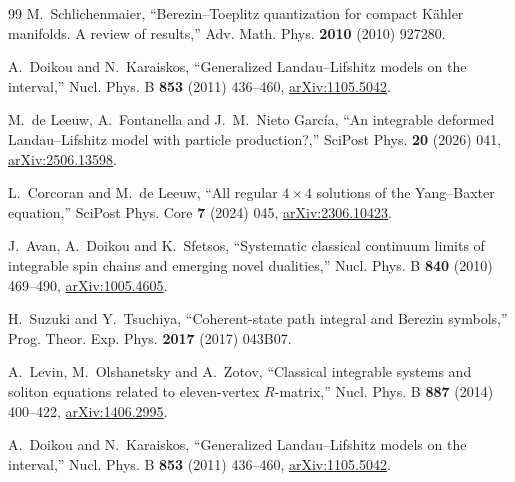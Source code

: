 \begin{thebibliography}{99}
M.~Schlichenmaier,
``Berezin--Toeplitz quantization for compact K\"ahler manifolds. A review of results,''
Adv. Math. Phys. \textbf{2010} (2010) 927280.

A.~Doikou and N.~Karaiskos,
``Generalized Landau--Lifshitz models on the interval,''
Nucl. Phys. B \textbf{853} (2011) 436--460,
\href{https://arxiv.org/abs/1105.5042}{arXiv:1105.5042}.

M.~de Leeuw, A.~Fontanella and J.~M.~Nieto Garc\'ia,
``An integrable deformed Landau--Lifshitz model with particle production?,''
SciPost Phys. \textbf{20} (2026) 041,
\href{https://arxiv.org/abs/2506.13598}{arXiv:2506.13598}.

L.~Corcoran and M.~de Leeuw,
``All regular $4\times4$ solutions of the Yang--Baxter equation,''
SciPost Phys. Core \textbf{7} (2024) 045,
\href{https://arxiv.org/abs/2306.10423}{arXiv:2306.10423}.

J.~Avan, A.~Doikou and K.~Sfetsos,
``Systematic classical continuum limits of integrable spin chains and emerging novel dualities,''
Nucl. Phys. B \textbf{840} (2010) 469--490,
\href{https://arxiv.org/abs/1005.4605}{arXiv:1005.4605}.

H.~Suzuki and Y.~Tsuchiya,
``Coherent-state path integral and Berezin symbols,''
Prog. Theor. Exp. Phys. \textbf{2017} (2017) 043B07.

A.~Levin, M.~Olshanetsky and A.~Zotov,
``Classical integrable systems and soliton equations related to eleven-vertex $R$-matrix,''
Nucl. Phys. B \textbf{887} (2014) 400--422,
\href{https://arxiv.org/abs/1406.2995}{arXiv:1406.2995}.

A.~Doikou and N.~Karaiskos,
``Generalized Landau--Lifshitz models on the interval,''
Nucl. Phys. B \textbf{853} (2011) 436--460,
\href{https://arxiv.org/abs/1105.5042}{arXiv:1105.5042}.

\end{thebibliography}
